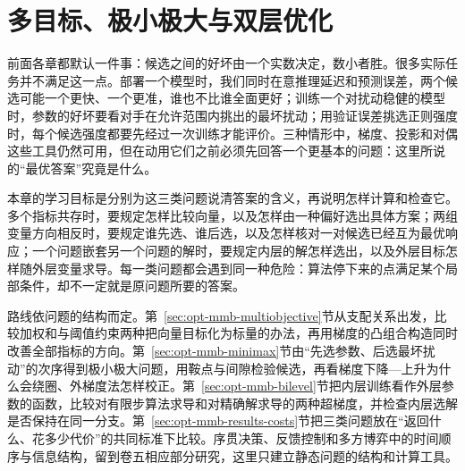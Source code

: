 \chapter{多目标、极小极大与双层优化}
\label{chap:opt-multi-minimax-bilevel}

前面各章都默认一件事：候选之间的好坏由一个实数决定，数小者胜。很多实际任务并不满足这一点。部署一个模型时，我们同时在意推理延迟和预测误差，两个候选可能一个更快、一个更准，谁也不比谁全面更好；训练一个对扰动稳健的模型时，参数的好坏要看对手在允许范围内挑出的最坏扰动；用验证误差挑选正则强度时，每个候选强度都要先经过一次训练才能评价。三种情形中，梯度、投影和对偶这些工具仍然可用，但在动用它们之前必须先回答一个更基本的问题：这里所说的“最优答案”究竟是什么。

本章的学习目标是分别为这三类问题说清答案的含义，再说明怎样计算和检查它。多个指标共存时，要规定怎样比较向量，以及怎样由一种偏好选出具体方案；两组变量方向相反时，要规定谁先选、谁后选，以及怎样核对一对候选已经互为最优响应；一个问题嵌套另一个问题的解时，要规定内层的解怎样选出，以及外层目标怎样随外层变量求导。每一类问题都会遇到同一种危险：算法停下来的点满足某个局部条件，却不一定就是原问题所要的答案。

路线依问题的结构而定。第~\ref{sec:opt-mmb-multiobjective}节从支配关系出发，比较加权和与阈值约束两种把向量目标化为标量的办法，再用梯度的凸组合构造同时改善全部指标的方向。第~\ref{sec:opt-mmb-minimax}节由“先选参数、后选最坏扰动”的次序得到极小极大问题，用鞍点与间隙检验候选，再看梯度下降—上升为什么会绕圈、外梯度法怎样校正。第~\ref{sec:opt-mmb-bilevel}节把内层训练看作外层参数的函数，比较对有限步算法求导和对精确解求导的两种超梯度，并检查内层选解是否保持在同一分支。第~\ref{sec:opt-mmb-results-costs}节把三类问题放在“返回什么、花多少代价”的共同标准下比较。序贯决策、反馈控制和多方博弈中的时间顺序与信息结构，留到卷五相应部分研究，这里只建立静态问题的结构和计算工具。






